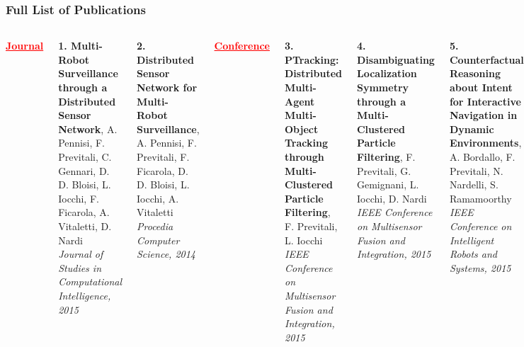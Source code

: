 \begin{frame}
	\frametitle{Full List of Publications}
	
	\vspace{-0.2cm}
	
	\begin{columns}[t]
		
		\tiny
		
		\textcolor{red}{\textbf{\underline{Journal}}}
		
		\vspace{0.1cm}
		
		\textbf{1. Multi-Robot Surveillance through a Distributed Sensor Network}, A. Pennisi, F.
		Previtali, C. Gennari, D. D. Bloisi, L. Iocchi, F. Ficarola, A. Vitaletti, D. Nardi \\
		\emph{Journal of Studies in Computational Intelligence, 2015}
		
		\vspace{0.15cm}
		
		\textbf{2. Distributed Sensor Network for Multi-Robot Surveillance}, A. Pennisi, F. Previtali,
		F. Ficarola, D. D. Bloisi, L. Iocchi, A. Vitaletti \\
		\emph{Procedia Computer Science, 2014}
		
		\vspace{0.2cm}
		
		\textcolor{red}{\textbf{\underline{Conference}}}
		
		\vspace{0.1cm}
		
		\textbf{3. PTracking: Distributed Multi-Agent Multi-Object Tracking through Multi-Clustered
		Particle Filtering}, F. Previtali, L. Iocchi \\
		\emph{IEEE Conference on Multisensor Fusion and Integration, 2015}
		
		\vspace{0.15cm}
		
		\textbf{4. Disambiguating Localization Symmetry through a Multi-Clustered Particle Filtering},
		F. Previtali, G. Gemignani, L. Iocchi, D. Nardi \\
		\emph{IEEE Conference on Multisensor Fusion and Integration, 2015}
		
		\vspace{0.15cm}
		
		\textbf{5. Counterfactual Reasoning about Intent for Interactive Navigation in Dynamic
		Environments}, A. Bordallo, F. Previtali, N. Nardelli, S. Ramamoorthy \\
		\emph{IEEE Conference on Intelligent Robots and Systems, 2015}
		

\end{columns}
\end{frame}
